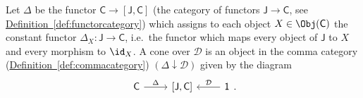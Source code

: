 \documentclass[notes.tex]{subfiles}
\begin{document}
\begin{definition}[cone]
  \label{def:cone}

  Let $\Delta$ be the functor $\mathsf{C} \rightarrow [\mathsf{J}, \mathsf{C}]$ (the category of functors $\mathsf{J} \rightarrow \mathsf{C}$, see \hyperref[def:functorcategory]{Definition~\ref*{def:functorcategory}}) which assigns to each object $X \in \Obj(\mathsf{C})$ the constant functor $\Delta_{X}: \mathsf{J} \rightarrow \mathsf{C}$, i.e.\ the functor which maps every object of $\mathsf{J}$ to $X$ and every morphism to $\id_{X}$. A cone over $\mathcal{D}$ is an object in the comma category (\hyperref[def:commacategory]{Definition~\ref*{def:commacategory}}) $(\Delta \downarrow \mathcal{D})$ given by the diagram
  \begin{equation*}
    \begin{tikzcd}
      \mathsf{C}
      \arrow[r, rightarrow, "\Delta"]
      & {[\mathsf{J}, \mathsf{C}]}
      & \mathsf{1}
      \arrow[l, swap, rightarrow, "\mathcal{D}"]
    \end{tikzcd}.
  \end{equation*}


\end{definition}
\end{document}
